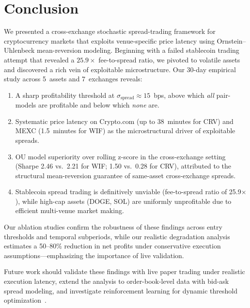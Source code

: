 \documentclass[sigconf,nonacm=false]{acmart}
\begin{document}
\section{Conclusion}\label{sec:conclusion}

We presented a cross-exchange stochastic spread-trading framework for cryptocurrency markets that exploits venue-specific price latency using Ornstein--Uhlenbeck mean-reversion modeling. Beginning with a failed stablecoin trading attempt that revealed a $25.9\times$ fee-to-spread ratio, we pivoted to volatile assets and discovered a rich vein of exploitable microstructure. Our 30-day empirical study across 5~assets and 7~exchanges reveals:

\begin{enumerate}
    \item A sharp profitability threshold at $\sigma_{\text{spread}} \approx 15$~bps, above which \emph{all} pair-models are profitable and below which \emph{none} are.
    \item Systematic price latency on Crypto.com (up to 38~minutes for CRV) and MEXC (1.5~minutes for WIF) as the microstructural driver of exploitable spreads.
    \item OU model superiority over rolling z-score in the cross-exchange setting (Sharpe 2.46 vs.\ 2.21 for WIF; 1.50 vs.\ 0.28 for CRV), attributed to the structural mean-reversion guarantee of same-asset cross-exchange spreads.
    \item Stablecoin spread trading is definitively unviable (fee-to-spread ratio of 25.9$\times$), while high-cap assets (DOGE, SOL) are uniformly unprofitable due to efficient multi-venue market making.
\end{enumerate}

Our ablation studies confirm the robustness of these findings across entry thresholds and temporal subperiods, while our realistic degradation analysis estimates a 50--80\% reduction in net profits under conservative execution assumptions---emphasizing the importance of live validation.

Future work should validate these findings with live paper trading under realistic execution latency, extend the analysis to order-book-level data with bid-ask spread modeling, and investigate reinforcement learning for dynamic threshold optimization~\cite{ning2024advanced, carapeto2024deep}.



\end{document}
